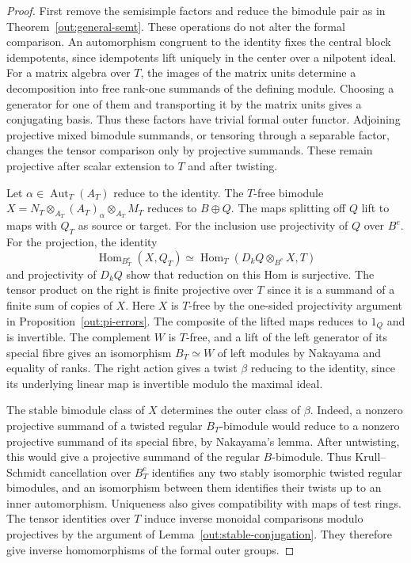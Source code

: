 \documentclass[12pt,a4paper,english,reqno]{amsart}
\numberwithin{equation}{section}
\theoremstyle{plain}
\theoremstyle{definition}
\begin{document}
\begin{proof}
First remove the semisimple factors and reduce the bimodule pair
as in Theorem~\ref{out:general-semt}. These operations do not
alter the formal comparison. An automorphism congruent to the
identity fixes the central block idempotents, since idempotents
lift uniquely in the center over a nilpotent ideal. For a matrix
algebra over $T$, the images of the matrix units determine a
decomposition into free rank-one summands of the defining module.
Choosing a generator for one of them and transporting it by the
matrix units gives a conjugating basis. Thus these factors have
trivial formal outer functor. Adjoining projective mixed bimodule
summands, or tensoring through a separable factor, changes the
tensor comparison only by projective summands. These remain
projective after scalar extension to $T$ and after twisting.

Let $\alpha\in\operatorname{Aut}_T(A_T)$ reduce to the identity.
The $T$-free bimodule
$X=N_T\otimes_{A_T}(A_T)_\alpha\otimes_{A_T}M_T$ reduces to
$B\oplus Q$. The maps splitting off $Q$ lift to maps with
$Q_T$ as source or target. For the inclusion use projectivity
of $Q$ over $B^e$. For the projection, the identity
\[
 \operatorname{Hom}_{B_T^e}(X,Q_T)
   \simeq \operatorname{Hom}_T(D_kQ\otimes_{B^e}X,T)
\]
and projectivity of $D_kQ$ show that reduction on this Hom is
surjective. The tensor product on the right is finite projective
over $T$ since it is a summand of a finite sum of copies of $X$.
Here $X$ is $T$-free by the one-sided projectivity argument in
Proposition~\ref{out:pi-errors}. The composite of the lifted
maps reduces to $1_Q$ and is invertible. The complement $W$
is $T$-free, and a lift of the left generator of its special
fibre gives an isomorphism $B_T\simeq W$ of left modules by
Nakayama and equality of ranks. The right action gives a twist
$\beta$ reducing to the identity, since its underlying linear
map is invertible modulo the maximal ideal.

The stable bimodule class of $X$ determines the outer class of
$\beta$. Indeed, a nonzero projective summand of a twisted regular
$B_T$-bimodule would reduce to a nonzero projective summand of
its special fibre, by Nakayama's lemma. After untwisting, this
would give a projective summand of the regular $B$-bimodule.
Thus Krull--Schmidt cancellation over $B_T^e$ identifies any
two stably isomorphic twisted regular bimodules, and an
isomorphism between them identifies their twists up to an inner
automorphism. Uniqueness also gives compatibility with maps of
test rings. The tensor identities over $T$ induce inverse monoidal
comparisons modulo projectives by the argument of
Lemma~\ref{out:stable-conjugation}. They therefore give inverse
homomorphisms of the formal outer groups.


\end{proof}
\end{document}
